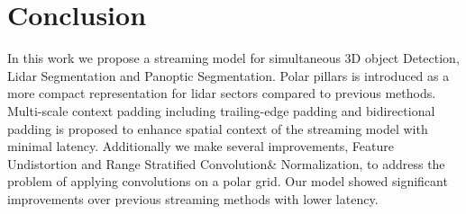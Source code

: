 \documentclass{article}
\begin{document}
\section{Conclusion}
In this work we propose a streaming model for simultaneous 3D object Detection, Lidar Segmentation and Panoptic Segmentation. Polar pillars is introduced as a more compact representation for lidar sectors compared to previous methods. Multi-scale context padding including trailing-edge padding and bidirectional padding is proposed to enhance spatial context of the streaming model with minimal latency. Additionally we make several improvements, Feature Undistortion and Range Stratified Convolution\& Normalization, to address the problem of applying convolutions on a polar grid. Our model showed significant improvements over previous streaming methods with lower latency.


\end{document}
